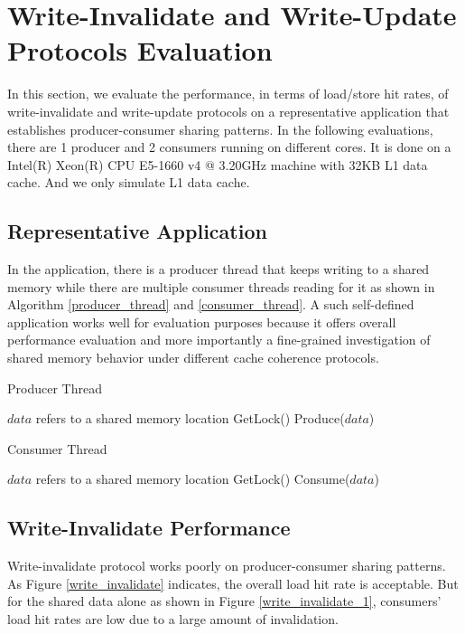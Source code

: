 \documentclass[conference]{IEEEtran}
\begin{document}
\newpage


\section{Write-Invalidate and Write-Update Protocols Evaluation}
In this section, we evaluate the performance, in terms of load/store hit rates, of write-invalidate and write-update protocols on a representative application that establishes producer-consumer sharing patterns. In the following evaluations, there are 1 producer and 2 consumers running on different cores. It is done on a Intel(R) Xeon(R) CPU E5-1660 v4 @ 3.20GHz machine with 32KB L1 data cache. And we only simulate L1 data cache.

\subsection{Representative Application}
In the application, there is a producer thread that keeps writing to a shared memory while there are multiple consumer threads reading for it as shown in Algorithm \ref{producer_thread} and \ref{consumer_thread}. A such self-defined application works well for evaluation purposes because it offers overall performance evaluation and more importantly a fine-grained investigation of shared memory behavior under different cache coherence protocols.

\begin{algorithm}
\caption{Producer Thread}
\label{producer_thread}
\begin{algorithmic}[1]
\State $data$ refers to a shared memory location
    \State GetLock() 
    \State Produce($data$)
\EndWhile
\end{algorithmic}
\end{algorithm}

\begin{algorithm}
\caption{Consumer Thread}
\label{consumer_thread}
\begin{algorithmic}[1]
\State $data$ refers to a shared memory location
    \State GetLock() 
    \State Consume($data$)
\EndWhile
\end{algorithmic}
\end{algorithm}


\subsection{Write-Invalidate Performance}
Write-invalidate protocol works poorly on producer-consumer sharing patterns. As Figure \ref{write_invalidate} indicates, the overall load hit rate is acceptable. But for the shared data alone as shown in Figure \ref{write_invalidate_1}, consumers' load hit rates are low due to a large amount of invalidation.
\end{document}
